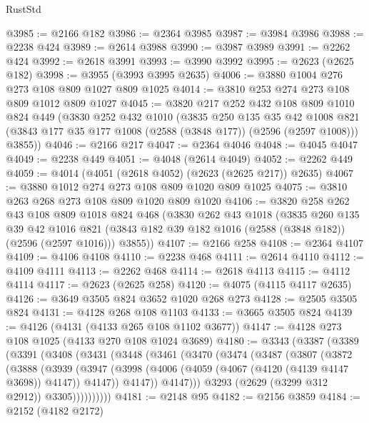 \begin{lexlean}{RustStd}
\begin{coremodule}
@3985 := @2166 @182
@3986 := @2364 @3985
@3987 := @3984 @3986
@3988 := @2238 @424
@3989 := @2614 @3988
@3990 := @3987 @3989
@3991 := @2262 @424
@3992 := @2618 @3991
@3993 := @3990 @3992
@3995 := @2623 (@2625 @182)
@3998 := @3955 (@3993 @3995 @2635)
@4006 := @3880 @1004 @276 @273 @108 @809 @1027 @809 @1025
@4014 := @3810 @253 @274 @273 @108 @809 @1012 @809 @1027
@4045 := @3820
    @217
    @252
    @432
    @108
    @809
    @1010
    @824
    @449
    (@3830
      @252
      @432
      @1010
      (@3835
        @250
        @135
        @35
        @42
        @1008
        @821
        (@3843 @177 @35 @177 @1008 (@2588 (@3848 @177)) (@2596 (@2597 @1008)))
        @3855))
@4046 := @2166 @217
@4047 := @2364 @4046
@4048 := @4045 @4047
@4049 := @2238 @449
@4051 := @4048 (@2614 @4049)
@4052 := @2262 @449
@4059 := @4014 (@4051 (@2618 @4052) (@2623 (@2625 @217)) @2635)
@4067 := @3880 @1012 @274 @273 @108 @809 @1020 @809 @1025
@4075 := @3810 @263 @268 @273 @108 @809 @1020 @809 @1020
@4106 := @3820
    @258
    @262
    @43
    @108
    @809
    @1018
    @824
    @468
    (@3830
      @262
      @43
      @1018
      (@3835
        @260
        @135
        @39
        @42
        @1016
        @821
        (@3843 @182 @39 @182 @1016 (@2588 (@3848 @182)) (@2596 (@2597 @1016)))
        @3855))
@4107 := @2166 @258
@4108 := @2364 @4107
@4109 := @4106 @4108
@4110 := @2238 @468
@4111 := @2614 @4110
@4112 := @4109 @4111
@4113 := @2262 @468
@4114 := @2618 @4113
@4115 := @4112 @4114
@4117 := @2623 (@2625 @258)
@4120 := @4075 (@4115 @4117 @2635)
@4126 := @3649 @3505 @824 @3652 @1020 @268 @273
@4128 := @2505 @3505 @824
@4131 := @4128 @268 @108 @1103
@4133 := @3665 @3505 @824
@4139 := @4126 (@4131 (@4133 @265 @108 @1102 @3677))
@4147 := @4128 @273 @108 @1025 (@4133 @270 @108 @1024 @3689)
@4180 := @3343
    (@3387
      (@3389
        (@3391
          (@3408
            (@3431
              (@3448
                (@3461
                  (@3470
                    (@3474
                      (@3487
                        (@3807
                          (@3872
                            (@3888
                              (@3939
                                (@3947
                                  (@3998
                                    (@4006 (@4059 (@4067 (@4120 (@4139 @4147 @3698)) @4147)) @4147))
                                  @4147))
                              @4147)))
                        @3293
                        (@2629 (@3299 @312 @2912))
                        @3305))))))))))
@4181 := @2148 @95
@4182 := @2156 @3859
@4184 := @2152 (@4182 @2172)

\end{coremodule}
\end{lexlean}
